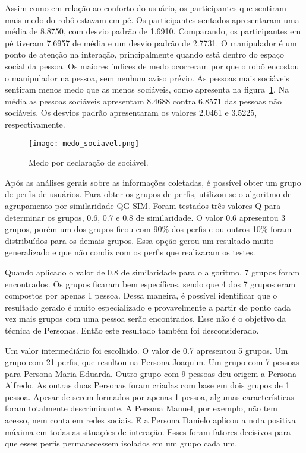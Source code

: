 Assim como em relação ao conforto do usuário, os participantes que sentiram mais medo do robô estavam em pé. Os participantes sentados apresentaram uma média de 8.8750, com desvio padrão de 1.6910. Comparando, os participantes em pé tiveram 7.6957 de média e um desvio padrão de 2.7731. O manipulador é um ponto de atenção na interação, principalmente quando está dentro do espaço social da pessoa. Os maiores índices de medo ocorreram por que o robô encostou o manipulador na pessoa, sem nenhum aviso prévio. As pessoas mais sociáveis sentiram menos medo que as menos sociáveis, como apresenta na figura~\ref{fig:medosociavel}. Na média as pessoas sociáveis apresentam 8.4688 contra 6.8571 das pessoas não sociáveis. Os desvios padrão apresentaram os valores 2.0461 e 3.5225, respectivamente.

\begin{figure}[ht!]
	\centering
	\begin{minipage}{0.65\textwidth}
		\caption{Medo por declaração de sociável.}
		\texttt{[image: medo\_sociavel.png]}
		\label{fig:medosociavel}
	\end{minipage}
\end{figure}

Após as análises gerais sobre as informações coletadas, é possível obter um grupo de perfis de usuários. Para obter os grupos de perfis, utilizou-se o algoritmo de agrupamento por similaridade QG-SIM. Foram testados três valores Q para determinar os grupos, 0.6, 0.7 e 0.8 de similaridade. O valor 0.6 apresentou 3 grupos, porém um dos grupos ficou com 90\% dos perfis e ou outros 10\% foram distribuídos para os demais grupos. Essa opção gerou um resultado muito generalizado e que não condiz com os perfis que realizaram os testes.

Quando aplicado o valor de 0.8 de similaridade para o algoritmo, 7 grupos foram encontrados. Os grupos ficaram bem específicos, sendo que 4 dos 7 grupos eram compostos por apenas 1 pessoa. Dessa maneira, é possível identificar que o resultado gerado é muito especializado e provavelmente a partir de ponto cada vez mais grupos com uma pessoa serão encontrados. Esse não é o objetivo da técnica de Personas. Então este resultado também foi desconsiderado.

Um valor intermediário foi escolhido. O valor de 0.7 apresentou 5 grupos. Um grupo com 21 perfis, que resultou na Persona Joaquim. Um grupo com 7 pessoas para Persona Maria Eduarda. Outro grupo com 9 pessoas deu origem a Persona Alfredo. As outras duas Personas foram criadas com base em dois grupos de 1 pessoa. Apesar de serem formados por apenas 1 pessoa, algumas características foram totalmente descriminante. A Persona Manuel, por exemplo, não tem acesso, nem conta em redes sociais. E a Persona Danielo aplicou a nota positiva máxima em todas as situações de interação. Esses foram fatores decisivos para que esses perfis permanecessem isolados em um grupo cada um.


